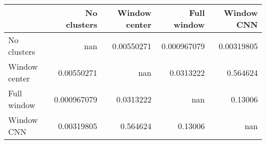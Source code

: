 \begin{tabular}{lrrrr}
\toprule
               &   No clusters &   Window center &   Full window &   Window CNN \\
\midrule
 No clusters   & nan           &      0.00550271 &   0.000967079 &   0.00319805 \\
 Window center &   0.00550271  &    nan          &   0.0313222   &   0.564624   \\
 Full window   &   0.000967079 &      0.0313222  & nan           &   0.13006    \\
 Window CNN    &   0.00319805  &      0.564624   &   0.13006     & nan          \\
\bottomrule
\end{tabular}